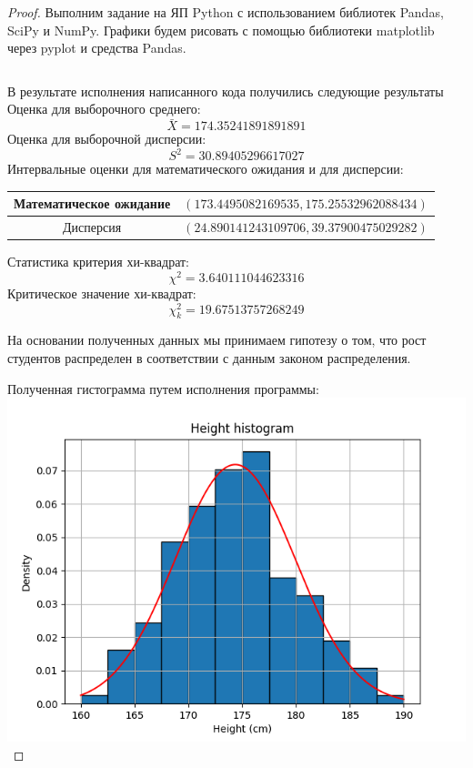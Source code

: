 \documentclass[a4paper,12pt]{article}
\newenvironment{solution}{\renewcommand{\proofname}{\unskip\indent\nopunct}\begin{proof}}{\end{proof}}
\begin{document}
\begin{solution}
Выполним задание на ЯП Python с использованием библиотек Pandas, SciPy 
и NumPy. Графики будем рисовать с помощью библиотеки matplotlib через 
pyplot и средства Pandas.


\inputminted{python}{hw2.py}

\newpage
В результате исполнения написанного кода получились следующие результаты
Оценка для выборочного среднего:
$$\bar{X} = 174.35241891891891$$
Оценка для выборочной дисперсии:
$$S^2 = 30.89405296617027$$
Интервальные оценки для математического ожидания и для дисперсии:
\begin{table}[h!]
    \centering
    \begin{tabular}{|c|c|}
        \hline
        Математическое ожидание & $(173.4495082169535, 175.25532962088434)$ \\ \hline
        Дисперсия & $(24.890141243109706, 39.37900475029282)$ \\ \hline

    \end{tabular}
\end{table}
\newline
Статистика критерия хи-квадрат:
$${\chi}^2 = 3.640111044623316$$
Критическое значение хи-квадрат:
$${\chi}^2_k = 19.67513757268249$$

На основании полученных данных мы принимаем гипотезу 
о том, что рост студентов распределен в соответствии с данным законом 
распределения.

Полученная гистограмма путем исполнения программы:
\newline
\includegraphics[width=\textwidth]{hist.png}

\end{solution}
\end{document}
